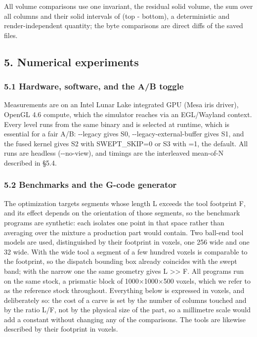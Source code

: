\documentclass[
]{article}
\begin{document}
All volume comparisons use one invariant, the residual solid volume, the
sum over all columns and their solid intervals of (top - bottom), a
deterministic and render-independent quantity; the byte comparisons are
direct diffs of the saved files.

\hypertarget{numerical-experiments}{%
\subsection{5. Numerical experiments}\label{numerical-experiments}}

\hypertarget{hardware-software-and-the-ab-toggle}{%
\subsubsection{5.1 Hardware, software, and the A/B
toggle}\label{hardware-software-and-the-ab-toggle}}

Measurements are on an Intel Lunar Lake integrated GPU (Mesa iris
driver), OpenGL 4.6 compute, which the simulator reaches via an
EGL/Wayland context. Every level runs from the same binary and is
selected at runtime, which is essential for a fair A/B: -\/-legacy gives
S0, -\/-legacy-external-buffer gives S1, and the fused kernel gives S2
with SWEPT\_SKIP=0 or S3 with =1, the default. All runs are headless
(-\/-no-view), and timings are the interleaved mean-of-N described in
§5.4.

\hypertarget{benchmarks-and-the-g-code-generator}{%
\subsubsection{5.2 Benchmarks and the G-code
generator}\label{benchmarks-and-the-g-code-generator}}

The optimization targets segments whose length L exceeds the tool
footprint F, and its effect depends on the orientation of those
segments, so the benchmark programs are synthetic: each isolates one
point in that space rather than averaging over the mixture a production
part would contain. Two ball-end tool models are used, distinguished by
their footprint in voxels, one 256 wide and one 32 wide. With the wide
tool a segment of a few hundred voxels is comparable to the footprint,
so the dispatch bounding box already coincides with the swept band; with
the narrow one the same geometry gives L \textgreater\textgreater{} F.
All programs run on the same stock, a prismatic block of 1000×1000×500
voxels, which we refer to as the reference stock throughout. Everything
below is expressed in voxels, and deliberately so: the cost of a carve
is set by the number of columns touched and by the ratio L/F, not by the
physical size of the part, so a millimetre scale would add a constant
without changing any of the comparisons. The tools are likewise
described by their footprint in voxels.
\end{document}
